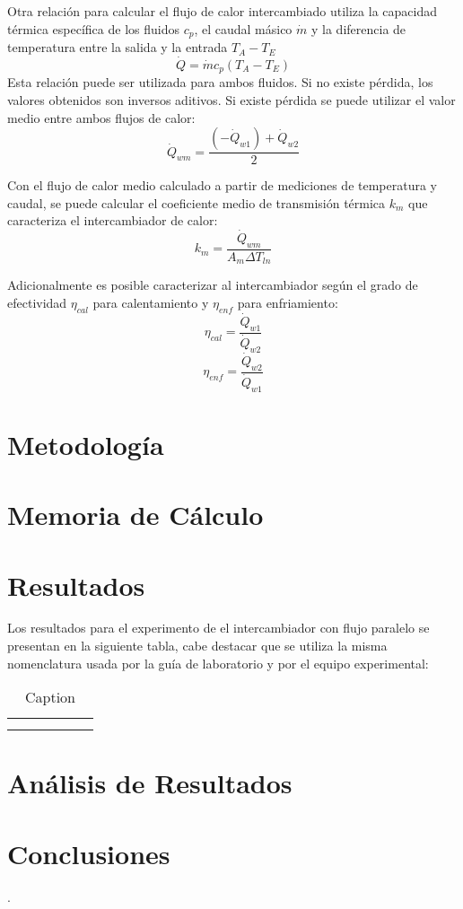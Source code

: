 \documentclass[letterpaper,11pt]{article} %
\begin{document}
Otra relación para calcular el flujo de calor intercambiado utiliza la capacidad térmica específica de los fluidos $c_p$, el caudal másico $\dot{m}$ y la diferencia de temperatura entre la salida y la entrada $T_{A}-T_{E}$
\begin{equation}
\dot{Q} = \dot{m}c_p (T_{A}-T_{E})
\end{equation}
Esta relación puede ser utilizada para ambos fluidos. Si no existe pérdida, los valores obtenidos son inversos aditivos. Si existe pérdida se puede utilizar el valor medio entre ambos flujos de calor:
\begin{equation}
\dot{Q}_{wm} = \frac{(-\dot{Q}_{w1}) + \dot{Q}_{w2}}{2}
\end{equation} 

Con el flujo de calor medio calculado a partir de mediciones de temperatura y caudal, se puede calcular el coeficiente medio de transmisión térmica $k_m$ que caracteriza el intercambiador de calor:
\begin{equation}
k_m = \frac{\dot{Q}_{wm}}{A_m \Delta T_{ln}}
\end{equation}

Adicionalmente es posible caracterizar al intercambiador según el grado de efectividad $\eta_{cal}$ para calentamiento y $\eta_{enf}$ para enfriamiento:
\begin{equation}
\eta_{cal} = \frac{\dot{Q}_{w1}}{\dot{Q}_{w2}}
\end{equation} 
\begin{equation}
\eta_{enf} = \frac{\dot{Q}_{w2}}{\dot{Q}_{w1}}
\end{equation}



\newpage

\section{Metodología}

\newpage
\section{Memoria de Cálculo}


\newpage
\section{Resultados}
Los resultados para el experimento de el intercambiador con flujo paralelo se presentan en la siguiente tabla, cabe destacar que se utiliza la misma nomenclatura usada por la guía de laboratorio y por el equipo experimental:
\begin{table}[]
    \centering
    \begin{tabular}{c|c|c|c|c|c}
         &  \\
         & 
    \end{tabular}
    \caption{Caption}
    \label{tab:my_label}
\end{table}




\newpage
\section{Análisis de Resultados}



\newpage
\section{Conclusiones}.




\end{document}
